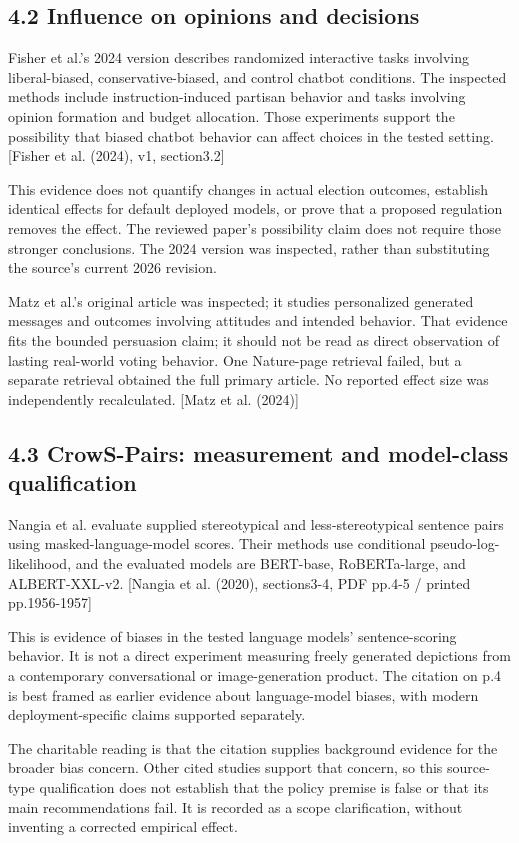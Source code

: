 \documentclass[10pt]{article}
\begin{document}
\subsection*{4.2 Influence on opinions and decisions}
Fisher et al.’s 2024 version describes randomized interactive tasks involving liberal-biased, conservative-biased, and control chatbot conditions. The inspected methods include instruction-induced partisan behavior and tasks involving opinion formation and budget allocation. Those experiments support the possibility that biased chatbot behavior can affect choices in the tested setting. [Fisher et al. (2024), v1, section3.2]\par
This evidence does not quantify changes in actual election outcomes, establish identical effects for default deployed models, or prove that a proposed regulation removes the effect. The reviewed paper’s possibility claim does not require those stronger conclusions. The 2024 version was inspected, rather than substituting the source’s current 2026 revision.\par
Matz et al.’s original article was inspected; it studies personalized generated messages and outcomes involving attitudes and intended behavior. That evidence fits the bounded persuasion claim; it should not be read as direct observation of lasting real-world voting behavior. One Nature-page retrieval failed, but a separate retrieval obtained the full primary article. No reported effect size was independently recalculated. [Matz et al. (2024)]\par
\subsection*{4.3 CrowS-Pairs: measurement and model-class qualification}
Nangia et al. evaluate supplied stereotypical and less-stereotypical sentence pairs using masked-language-model scores. Their methods use conditional pseudo-log-likelihood, and the evaluated models are BERT-base, RoBERTa-large, and ALBERT-XXL-v2. [Nangia et al. (2020), sections3-4, PDF pp.4-5 / printed pp.1956-1957]\par
This is evidence of biases in the tested language models’ sentence-scoring behavior. It is not a direct experiment measuring freely generated depictions from a contemporary conversational or image-generation product. The citation on p.4 is best framed as earlier evidence about language-model biases, with modern deployment-specific claims supported separately.\par
The charitable reading is that the citation supplies background evidence for the broader bias concern. Other cited studies support that concern, so this source-type qualification does not establish that the policy premise is false or that its main recommendations fail. It is recorded as a scope clarification, without inventing a corrected empirical effect.\par
\end{document}
